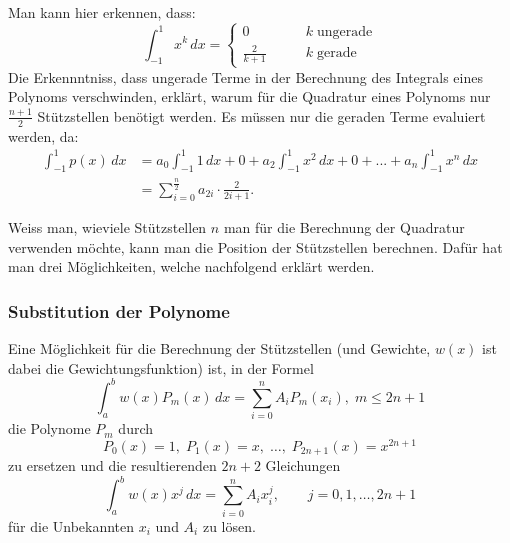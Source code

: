 Man kann hier erkennen, dass:
\begin{equation}
    \int_{-1}^{1} x^{k}\,dx 
    =
    \begin{cases}
        0&\qquad k \; \text{ungerade}\\
        \frac{2}{k+1}&\qquad k \; \text{gerade}
        \end{cases}  
\end{equation}
Die Erkennntniss, dass ungerade Terme in der Berechnung 
des Integrals eines Polynoms verschwinden, 
erklärt, warum für die Quadratur eines Polynoms nur $\frac{n+1}{2}$ 
Stützstellen benötigt werden. Es müssen nur die geraden Terme evaluiert werden,
da:
\begin{align}
    \int_{-1}^{1} p(x)\,dx 
    &=
    a_{0} \int_{-1}^{1} 1\,dx
    +
    0
    + 
    a_{2}\int_{-1}^{1} x^{2} \,dx  
    +
    0
    +
    ... 
    +
    a_{n}\int_{-1}^{1} x^{n}\,dx
    \\
    &= \sum_{i=0}^{\frac{n}{2}} a_{2i} \cdot \frac{2}{2i+1}.
\end{align}
    


Weiss man, wieviele Stützstellen $n$ man für die Berechnung der Quadratur verwenden möchte,
kann man die Position der Stützstellen berechnen. 
Dafür hat man drei Möglichkeiten, welche nachfolgend erklärt werden.

\subsubsection{Substitution der Polynome}
Eine Möglichkeit für die Berechnung der Stützstellen 
(und Gewichte, $w(x)$ ist dabei die Gewichtungsfunktion) ist, in der Formel
\begin{equation} \label{quadratur:equation:polynomsubstitution}
    \int_{a}^{b}w(x)P_{m}(x)\, dx = \sum_{i=0}^{n}A_{i}P_{m}(x_{i}), \; m \leq 2n + 1
\end{equation}
die Polynome $P_{m}$ durch
\begin{equation}
     P_{0}(x) = 1,\; P_{1}(x) = x,\; \dots ,\; P_{2n+1}(x) = x^{2n+1}
\end{equation}
zu ersetzen und die resultierenden $2n+2$ Gleichungen 
\begin{equation}
    \int_{a}^{b}w(x)x^{j}\,dx = \sum_{i=0}^{n} A_{i}x_{i}^{j},\qquad j = 0, 1, \dots , 2 n + 1
\end{equation}
für die Unbekannten $x_{i}$ und $A_{i}$ zu lösen.

